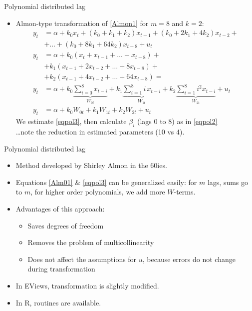 \documentclass{beamer}
\begin{document}
\begin{frame}{Polynomial distributed lag}
\begin{itemize}
\item Almon-type transformation of \eqref{Almon1} for $m=8$ and $k=2$:
\begin{align} \nonumber
y_t & =  \alpha + k_0 x_t + (k_0 + k_1 + k_2)x_{t-1} + (k_0 + 2k_1 + 4k_2)x_{t-2} + \\ & + \dots + (k_0 + 8k_1 + 64k_2)x_{t-8}+u_t 
\\ \nonumber
y_t & = \alpha + k_0 (x_t + x_{t-1} + \dots + x_{t-8}) + \\ \nonumber & +  k_1(x_{t-1} + 2 x_{t-2} + \dots + 8 x_{t-8}) + \\ \nonumber & + k_2(x_{t-1} + 4x_{t-2} + \dots + 64x_{t-8}) = \\ 
y_t & = \alpha + k_0 \underbrace{\sum_{i=0}^8 x_{t-i}}_{W_{0t}} + k_1 \underbrace{\sum_{i=1}^8 i\, x_{t-i}}_{W_{1t}}  + k_2 \underbrace{\sum_{i=1}^8 i^2 x_{t-i}}_{W_{2t}}  + u_t \label{Alm01}\\
y_t & = \alpha + k_0 W_{0t} + k_1 W_{1t} + k_2 W_{2t} + u_t \label{eqpol3}
\end{align}
We estimate \eqref{eqpol3}, then calculate $\beta_i$ (lags 0 to 8) as in \eqref{eqpol2}\\
\dots note the reduction in estimated parameters (10 vs 4).
\end{itemize}
\end{frame}
\begin{frame}{Polynomial distributed lag}
\begin{itemize}
\item Method developed by Shirley Almon in the 60ies.
\item Equations \eqref{Alm01}  \& \eqref{eqpol3} can be generalized easily: for $m$ lags, sums go to $m$, for higher order polynomials, we add more $W$-terms.
\vspace{0.3cm}
\item Advantages of this approach:
\begin{itemize}
\item Saves degrees of freedom
 \item Removes the problem of multicollinearity
 \item Does not affect the assumptions for $u$, because errors do not change during transformation
\end{itemize}
\vspace{0.3cm}
\item In EViews, transformation is slightly modified.
\item In R, routines are available.
\end{itemize}
\end{frame}
\end{document}
